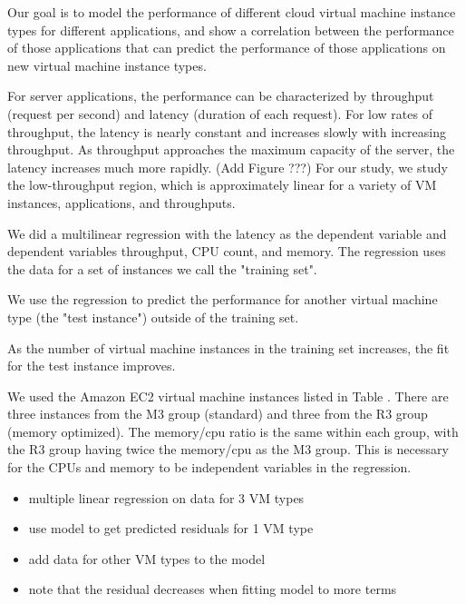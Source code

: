 \documentclass{acm_proc_article-sp}
\newcommand{\mm}[1]{{\color{red}#1}}
\begin{document}
\mm{
Our goal is to model the performance of different cloud virtual machine instance types for different applications, and show a correlation between the performance of those applications that can predict the performance of those applications on new virtual machine instance types.

For server applications, the performance can be characterized by throughput (request per second) and latency (duration of each request).  For low rates of throughput, the latency is nearly constant and increases slowly with increasing throughput.  As throughput approaches the maximum capacity of the server, the latency increases much more rapidly.  (Add Figure ???) For our study, we study the low-throughput region, which is approximately linear for a variety of VM instances, applications, and throughputs.

We did a multilinear regression with the latency as the dependent variable and dependent variables throughput, CPU count, and memory.  The regression uses the data for a set of instances we call the "training set".

We use the regression to predict the performance for another virtual machine type (the "test instance") outside of the training set.

As the number of virtual machine instances in the training set increases, the fit for the test instance improves.

We used the Amazon EC2 virtual machine instances listed in Table \label{table:awstypes}.  There are three instances from the M3 group (standard) and three from the R3 group (memory optimized).  The memory/cpu ratio is the same within each group, with the R3 group having twice the memory/cpu as the M3 group.  This is necessary for the CPUs and memory to be independent variables in the regression.

\begin{itemize}
\item multiple linear regression on data for 3 VM types
\item use model to get predicted residuals for 1 VM type
\item add data for other VM types to the model
\item note that the residual decreases when fitting model to more terms
\end{itemize}

}

\end{document}
